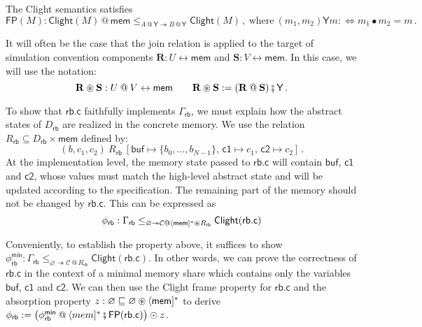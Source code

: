 \documentclass[acmsmall,screen,review,anonymous]{acmart}
\newcommand{\kw}[1]{\ensuremath{ \mathsf{#1} }}
\newcommand{\jr}{\mathsf{Y}}
\newcommand{\vcomp}{\fatsemi}
\newcommand{\sepconj}{\oast}
\begin{document}
\begin{theorem} \label{thm:clightframe}
The Clight semantics satisfies
\[
  \kw{FP}(M) :
  \kw{Clight}(M) \mathbin@ \kw{mem}
  \le_{A \mathbin@ \jr \twoheadrightarrow B \mathbin@ \jr}
  \kw{Clight}(M)
  \,,
  \: \text{where} \:
  (m_1, m_2) \mathrel{\jr} m  :\Leftrightarrow
  m_1 \bullet m_2 = m
  \,.
\]
\end{theorem}

It will often be the case that the join relation
is applied to the target of
simulation convention components
$\mathbf{R} : U \leftrightarrow \kw{mem}$ and
$\mathbf{S} : V \leftrightarrow \kw{mem}$.
In this case,
we will use the notation:
\[
  \mathbf{R} \sepconj \mathbf{S} : U \mathbin@ V \leftrightarrow \kw{mem}
  \qquad
  \mathbf{R} \sepconj \mathbf{S} :=
  (\mathbf{R} \mathbin@ \mathbf{S}) \vcomp \jr
  \,.
\]


\begin{example} %
To show that $\kw{rb.c}$
faithfully implements $\Gamma_\kw{rb}$,
we must explain how the abstract states of $D_\kw{rb}$
are realized in the concrete memory.
We use the relation
$R_\kw{rb} \subseteq D_\kw{rb} \times \kw{mem}$
defined by:
\[
  (b, c_1, c_2) \: \mathrel{R_\kw{rb}} \:
  [\kw{buf} \mapsto \{b_0, \ldots, b_{N-1}\}, \,
   \kw{c1} \mapsto c_1, \,
   \kw{c2} \mapsto c_2]
  \,.
\]
At the implementation level,
the memory state passed to $\kw{rb.c}$
will contain $\kw{buf}$, $\kw{c1}$ and $\kw{c2}$,
whose values must match the high-level abstract state
and will be updated according to the specification.
The remaining part of the memory should not be changed by $\kw{rb.c}$.
This can be expressed as
\begin{equation} \label{eqn:rbcorrect}
  \phi_\kw{rb} :
  \Gamma_\kw{rb}
  \le_{\varnothing \twoheadrightarrow
       \mathcal{C} \mathbin@
       \langle \kw{mem} ]^* \sepconj R_\kw{rb}}
  \kw{Clight}(\kw{rb.c})
\end{equation}

Conveniently,
to establish the property above,
it suffices to show
$\phi_\kw{rb}^\kw{min} :
  \Gamma_\kw{rb}
  \le_{\varnothing \twoheadrightarrow \mathcal{C} \mathbin@ R_\kw{rb}}
  \kw{Clight}(\kw{rb.c})
$.
In other words,
we can prove the correctness of $\kw{rb.c}$
in the context of a minimal memory share
which contains only the variables $\kw{buf}$, $\kw{c1}$ and $\kw{c2}$.
We can then use the Clight frame property for $\kw{rb.c}$
and the absorption property
$z : \varnothing \sqsubseteq \varnothing \sepconj \langle\kw{mem}]^*$
to derive
$
  \phi_\kw{rb} :=
  \big(
    \phi_\kw{rb}^\kw{min} \mathbin@ \langle mem ]^*
    \vcomp
    \kw{FP}(\kw{rb.c})
  \big) \odot z
$.
\end{example}
\end{document}
